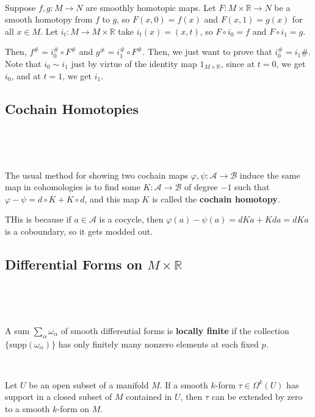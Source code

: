 \documentclass{article}
\begin{document}
\begin{customproof}
\

Suppose $f, g: M \to N$ are smoothly homotopic maps. Let $F: M \times \mathbb{R} \to N$ be a smooth homotopy from $f$ to $g$, so $F(x,0) = f(x)$ and $F(x,1) = g(x)$ for all $x \in M$. Let $i_t: M \to M \times \mathbb{R}$ take $i_t(x) = (x,t)$, so $F \circ i_0 = f$ and $F \circ i_1 = g$.

Then, $f^\# = i_0^\# \circ F^\#$ and $g^\# = i^\#_1 \circ F^\#$. Then, we just want to prove that $i_0^\# = i_1\#$. Note that $i_0 \sim i_1$ just by virtue of the identity map $1_{M \times \mathbb{R}}$, since at $t = 0$, we get $i_0$, and at $t=1$, we get $i_1$.
\end{customproof}

\subsection{Cochain Homotopies}
\

\begin{definition}
\

The usual method for showing two cochain maps $\varphi, \psi: \mathcal{A} \to \mathcal{B}$ induce the same map in cohomologies is to find some $K: \mathcal{A} \to \mathcal{B}$ of degree $-1$ such that $\varphi - \psi = d \circ K + K \circ d$, and this map $K$ is called the \textbf{cochain homotopy}.

THis is because if $a \in \mathcal{A}$ is a cocycle, then $\varphi(a) - \psi(a) = dKa + Kda = dKa$ is a coboundary, so it gets modded out. 
\end{definition}

\subsection{Differential Forms on $M \times \mathbb{R}$}
\

\begin{definition}
\

A sum $\sum_{\alpha} \omega_\alpha$ of smooth differential forms is \textbf{locally finite} if the collection $\{\text{supp}(\omega_\alpha)\}$ has only finitely many nonzero elements at each fixed $p$. 
\end{definition}

\begin{lemma}
\

Let $U$ be an open subset of a manifold $M$. If a smooth $k$-form $\tau \in \Omega^k(U)$ has support in a closed subset of $M$ contained in $U$, then $\tau$ can be extended by zero to a smooth $k$-form on $M$.
\end{lemma}
\end{document}
